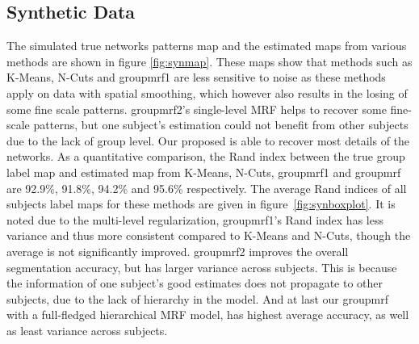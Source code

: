 \documentclass[final,authoryear,5p,twocolumn]{elsarticle}
\begin{document}
\subsection{Synthetic Data}
The simulated true networks patterns map and the estimated maps from various
methods are shown in figure \ref{fig:synmap}. These maps show that methods such
as \textsf{K-Means}, \textsf{N-Cuts} and \textsf{groupmrf1} are less sensitive
to noise as these methods apply on data with spatial smoothing, which however
also results in the losing of some fine scale patterns. \textsf{groupmrf2}'s
single-level MRF helps to recover some fine-scale patterns, but one subject's
estimation could not benefit from other subjects due to the lack of group
level. Our proposed  is able to recover most details of the
networks. As a quantitative comparison, the Rand index between the true group
label map and estimated map from \textsf{K-Means}, \textsf{N-Cuts},
\textsf{groupmrf1} and \textsf{groupmrf} are 92.9\%, 91.8\%, 94.2\% and 95.6\%
respectively. The average Rand indices of all subjects label maps for these
methods are given in figure~\ref{fig:synboxplot}. It is noted due to the
multi-level regularization, \textsf{groupmrf1}'s Rand index has less variance
and thus more consistent compared to \textsf{K-Means} and \textsf{N-Cuts},
though the average is not significantly improved. \textsf{groupmrf2} improves
the overall segmentation accuracy, but has larger variance across subjects. This
is because the information of one subject's good estimates does not propagate to
other subjects, due to the lack of hierarchy in the model. And at last our
\textsf{groupmrf} with a full-fledged hierarchical MRF model, has highest
average accuracy, as well as least variance across subjects.

\end{document}
